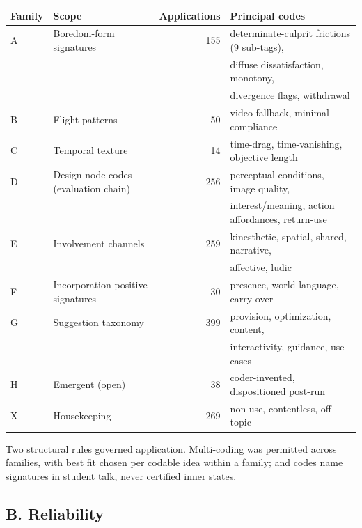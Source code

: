 \begin{center}
\begin{tabular}{llrl}
\hline
Family & Scope & Applications & Principal codes \\
\hline
A & Boredom-form signatures & 155 & determinate-culprit frictions (9 sub-tags), \\
  &                          &     & diffuse dissatisfaction, monotony, \\
  &                          &     & divergence flags, withdrawal \\
B & Flight patterns & 50 & video fallback, minimal compliance \\
C & Temporal texture & 14 & time-drag, time-vanishing, objective length \\
D & Design-node codes (evaluation chain) & 256 & perceptual conditions, image quality, \\
  &                          &     & interest/meaning, action affordances, return-use \\
E & Involvement channels & 259 & kinesthetic, spatial, shared, narrative, \\
  &                          &     & affective, ludic \\
F & Incorporation-positive signatures & 30 & presence, world-language, carry-over \\
G & Suggestion taxonomy & 399 & provision, optimization, content, \\
  &                          &     & interactivity, guidance, use-cases \\
H & Emergent (open) & 38 & coder-invented, dispositioned post-run \\
X & Housekeeping & 269 & non-use, contentless, off-topic \\
\hline
\end{tabular}
\end{center}


Two structural rules governed application. Multi-coding was permitted across
families, with best fit chosen per codable idea within a family; and codes
name signatures in student talk, never certified inner states.

\subsection*{B. Reliability}

